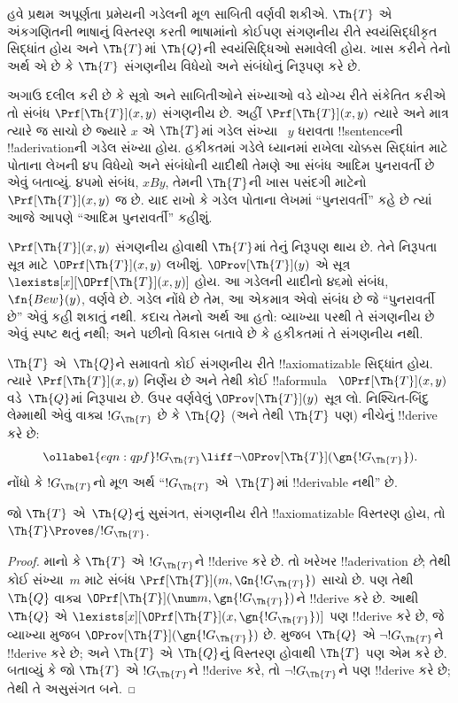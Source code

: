 \documentclass[../../../include/open-logic-section]{subfiles}
\begin{document}


હવે પ્રથમ અપૂર્ણતા પ્રમેયની
ગડેલની મૂળ સાબિતી
વર્ણવી શકીએ. $\Th{T}$
એ અંકગણિતની ભાષાનું
વિસ્તરણ કરતી ભાષામાંનો
કોઈપણ સંગણનીય રીતે
સ્વયંસિદ્ધીકૃત સિદ્ધાંત હોય
અને $\Th{T}$માં
$\Th{Q}$ની સ્વયંસિદ્ધિઓ
સમાવેલી હોય. ખાસ કરીને
તેનો અર્થ એ છે કે
$\Th{T}$ સંગણનીય
વિધેયો અને સંબંધોનું
નિરૂપણ કરે છે.

અગાઉ દલીલ કરી છે કે
સૂત્રો અને સાબિતીઓને
સંખ્યાઓ વડે યોગ્ય રીતે
સંકેતિત કરીએ તો સંબંધ
$\Prf[\Th{T}](x,y)$
સંગણનીય છે. અહીં
$\Prf[\Th{T}](x,y)$
ત્યારે અને માત્ર ત્યારે જ
સાચો છે જ્યારે $x$ એ
$\Th{T}$માં ગડેલ સંખ્યા
~$y$ ધરાવતા !!{sentence}ની
!!a{derivation}ની ગડેલ
સંખ્યા હોય. હકીકતમાં
ગડેલે ધ્યાનમાં રાખેલા
ચોક્કસ સિદ્ધાંત માટે
પોતાના લેખની ૪૫ વિધેયો
અને સંબંધોની યાદીથી
તેમણે આ સંબંધ આદિમ
પુનરાવર્તી છે એવું બતાવ્યું.
૪૫મો સંબંધ, $x B y$,
તેમની $\Th{T}$ની ખાસ
પસંદગી માટેનો
$\Prf[\Th{T}](x,y)$
જ છે. યાદ રાખો કે
ગડેલ પોતાના લેખમાં
``પુનરાવર્તી'' કહે છે
ત્યાં આજે આપણે
``આદિમ પુનરાવર્તી''
કહીશું.

$\Prf[\Th{T}](x,y)$ સંગણનીય
હોવાથી $\Th{T}$માં તેનું
નિરૂપણ થાય છે. તેને
નિરૂપતા સૂત્ર માટે
$\OPrf[\Th{T}](x,y)$
લખીશું. $\OProv[\Th{T}](y)$
એ સૂત્ર
$\lexists[x][\OPrf[\Th{T}](x,y)]$
હોય. આ ગડેલની યાદીનો
૪૬મો સંબંધ,
$\fn{Bew}(y)$, વર્ણવે છે.
ગડેલ નોંધે છે તેમ,
આ એકમાત્ર એવો સંબંધ
છે જે ``પુનરાવર્તી છે''
એવું કહી શકાતું નથી.
કદાચ તેમનો અર્થ આ હતો:
વ્યાખ્યા પરથી તે સંગણનીય
છે એવું સ્પષ્ટ થતું નથી;
અને પછીનો વિકાસ બતાવે
છે કે હકીકતમાં તે
સંગણનીય નથી.

$\Th{T}$ એ~$\Th{Q}$ને
સમાવતો કોઈ
સંગણનીય રીતે !!{axiomatizable} સિદ્ધાંત
હોય. ત્યારે
$\Prf[\Th{T}](x, y)$
નિર્ણેય છે અને તેથી
કોઈ !!a{formula}
~$\OPrf[\Th{T}](x, y)$
વડે~$\Th{Q}$માં નિરૂપાય
છે. ઉપર વર્ણવેલું
$\OProv[\Th{T}](y)$
સૂત્ર લો. નિશ્ચિત-બિંદુ
લેમ્માથી એવું વાક્ય
$!G_\Th{T}$ છે કે
$\Th{Q}$ (અને તેથી
$\Th{T}$ પણ) નીચેનું
!!{derive} કરે છે:
\begin{equation}
\ollabel{eqn:qpf}
!G_\Th{T} \liff \lnot \OProv[\Th{T}](\gn{!G_\Th{T}}).
\end{equation}
નોંધો કે $!G_\Th{T}$નો
મૂળ અર્થ ``$!G_\Th{T}$
એ~$\Th{T}$માં
!!{derivable} નથી'' છે.

\begin{lem}
જો $\Th{T}$ એ~$\Th{Q}$નું
સુસંગત,
સંગણનીય રીતે !!{axiomatizable} વિસ્તરણ
હોય, તો
$\Th{T} \Proves/ !G_\Th{T}$.
\end{lem}

\begin{proof}
માનો કે $\Th{T}$ એ
$!G_\Th{T}$ને !!{derive}
કરે છે. તો ખરેખર
!!a{derivation} \emph{છે};
તેથી કોઈ સંખ્યા~$m$ માટે
સંબંધ $\Prf[\Th{T}](m,
\Gn{!G_\Th{T}})$ સાચો છે.
પણ તેથી $\Th{Q}$ વાક્ય
$\OPrf[\Th{T}](\num m, \gn{!G_\Th{T}})$ને
!!{derive} કરે છે.
આથી $\Th{Q}$ એ
$\lexists[x][\OPrf[\Th{T}](x,\gn{!G_\Th{T}})]$
પણ !!{derive} કરે છે,
જે વ્યાખ્યા મુજબ
$\OProv[\Th{T}](\gn{!G_\Th{T}})$
છે. 
મુજબ $\Th{Q}$ એ
$\lnot !G_\Th{T}$ને
!!{derive} કરે છે;
અને $\Th{T}$ એ
$\Th{Q}$નું વિસ્તરણ
હોવાથી $\Th{T}$ પણ
એમ કરે છે. બતાવ્યું કે
જો $\Th{T}$ એ
$!G_\Th{T}$ને !!{derive}
કરે, તો $\lnot !G_\Th{T}$ને
પણ !!{derive} કરે છે;
તેથી તે અસુસંગત બને.
\end{proof}
\end{document}
